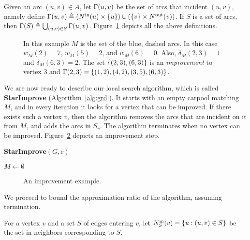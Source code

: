 Given an arc $(u,v) \in A$, let $\inc(u,v)$ be the set of arcs that
incident $(u, v)$, namely define
\(
\inc(u,v) \eqdf (\nin[](u) \times \{u\}) \cup (\{v\} \times \nout[](v))
\).
If $S$ is a set of arcs, then $\inc(S) \eqdf \bigcup_{(u,v) \in
S} \inc(u,v)$.
%
Figure~\ref{fig:defs} depicts all the above definitions.

\begin{figure}
\centering

\caption{In this example $M$ is the set of the blue, dashed arcs.
In this case $w_M(2) = 7$, $w_M(5) = 2$, and $w_M(6) = 0$.  Also,
$\delta_M(2, 3) = 1$ and $\delta_M(6, 3) = 2$.  The set $\set{(2,3),
(6,3)}$ is an \emph{improvement} to vertex 3 and $\inc(2,3)
= \set{(1,2),(4,2),(3,5),(6,3)}$.}
\label{fig:defs}
\end{figure}

We are now ready to describe our local search algorithm, which is
called \textbf{StarImprove} (Algorithm~\ref{alg:grd}).  It starts with
an empty carpool matching $M$, and in every iteration it looks for a
vertex that can be improved.  If there exists such a vertex $v$, then
the algorithm removes the arcs that are incident on it from $M$, and
adds the arcs in $S_v$.  The algorithm terminates when no vertex can
be improved.  Figure~\ref{fig:improvement} depicts an improvement
step.

\begin{algorithm}
\caption{\textbf{StarImprove}$(G,c)$}
\label{alg:grd}
\begin{small}
$M \gets \emptyset$ \\
\end{small}
\end{algorithm}

\begin{figure}
\centering

\caption[]{An improvement example.}
\label{fig:improvement}
\end{figure}

We proceed to bound the approximation ratio of the algorithm, assuming
termination.

For a vertex $v$ and a set $S$ of edges entering $v$, let $\nin[S](v)
= \set{u : (u,v) \in S}$ be the set in-neighbors corresponding to $S$.

